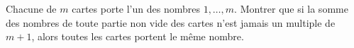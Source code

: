 Chacune de $m$ cartes porte l'un des nombres $1, \ldots, m$. Montrer que si la somme des nombres de toute partie non vide des cartes n'est jamais un multiple de $m + 1$, alors toutes les cartes portent le même nombre.
